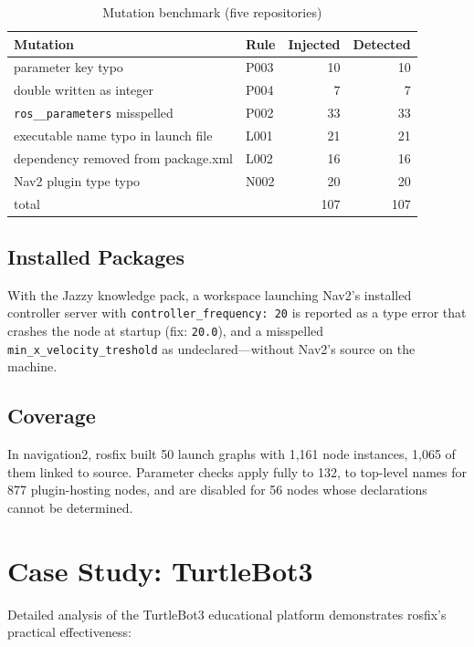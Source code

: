 \documentclass[conference]{IEEEtran}
\newcommand{\code}[1]{\texttt{#1}}
\begin{document}
\begin{table}[t]
\centering
\caption{Mutation benchmark (five repositories)}
\label{tab:mut}
\footnotesize
\begin{tabular}{@{}llrr@{}}
\toprule
Mutation & Rule & Injected & Detected\\
\midrule
parameter key typo                   & P003 & 10 & 10\\
double written as integer            & P004 &  7 &  7\\
\code{ros\_\_parameters} misspelled  & P002 & 33 & 33\\
executable name typo in launch file  & L001 & 21 & 21\\
dependency removed from package.xml  & L002 & 16 & 16\\
Nav2 plugin type typo                & N002 & 20 & 20\\
\midrule
total                                &      & 107 & 107\\
\bottomrule
\end{tabular}
\end{table}

\subsection{Installed Packages}

With the Jazzy knowledge pack, a workspace launching Nav2's installed controller server with
\code{controller\_frequency: 20} is reported as a type error that crashes the node at startup
(fix: \code{20.0}), and a misspelled \code{min\_x\_velocity\_treshold} as undeclared---without
Nav2's source on the machine.

\subsection{Coverage}

In navigation2, rosfix built 50 launch graphs with 1,161 node instances, 1,065 of them linked to
source. Parameter checks apply fully to 132, to top-level names for 877 plugin-hosting nodes, and
are disabled for 56 nodes whose declarations cannot be determined.

\section{Case Study: TurtleBot3}

Detailed analysis of the TurtleBot3 educational platform demonstrates rosfix's practical
effectiveness:
\end{document}
